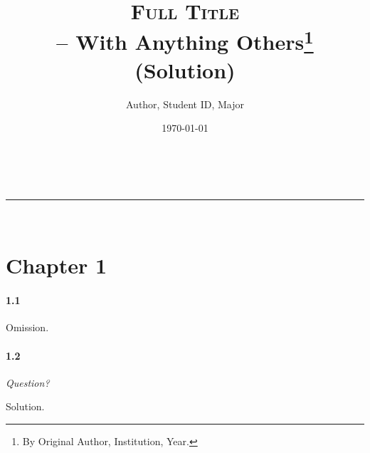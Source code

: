 \documentclass[a4paper,12pt]{article}\usepackage[]{graphicx}\usepackage[]{color}
\makeatletter
\newcommand{\linia}{\rule{\linewidth}{0.5pt}}
\theoremstyle{mytheor}
\renewcommand{\maketitle}{
\begin{center}
\vspace{2ex}
{\Huge \@title}
\vspace{1ex}
\\
\linia\\
\@author \hfill \@date
\vspace{4ex}
\end{center}
}
\makeatother
\begin{document}
\title{\textsc{Full Title}\vspace{0.5ex}\\
-- \Large{With Anything Others\footnote{By Original Author, Institution, Year.} (Solution)}}
\author{Author, Student ID, Major}
\date{\today}
\maketitle

\section{Chapter 1}
\paragraph{1.1}
Omission.
\paragraph{1.2}
\textit{Question?}

Solution.
\end{document}
